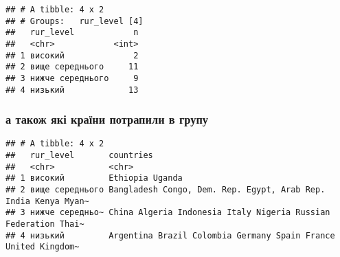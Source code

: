 \documentclass[
]{article}
\newenvironment{Shaded}{\begin{snugshade}}{\end{snugshade}}
\newcommand{\ControlFlowTok}[1]{\textcolor[rgb]{0.13,0.29,0.53}{\textbf{#1}}}
\newcommand{\DataTypeTok}[1]{\textcolor[rgb]{0.13,0.29,0.53}{#1}}
\newcommand{\DecValTok}[1]{\textcolor[rgb]{0.00,0.00,0.81}{#1}}
\newcommand{\KeywordTok}[1]{\textcolor[rgb]{0.13,0.29,0.53}{\textbf{#1}}}
\newcommand{\NormalTok}[1]{#1}
\newcommand{\OperatorTok}[1]{\textcolor[rgb]{0.81,0.36,0.00}{\textbf{#1}}}
\newcommand{\OtherTok}[1]{\textcolor[rgb]{0.56,0.35,0.01}{#1}}
\newcommand{\StringTok}[1]{\textcolor[rgb]{0.31,0.60,0.02}{#1}}
\begin{document}
\begin{verbatim}
## # A tibble: 4 x 2
## # Groups:   rur_level [4]
##   rur_level            n
##   <chr>            <int>
## 1 високий              2
## 2 вище середнього     11
## 3 нижче середнього     9
## 4 низький             13
\end{verbatim}

\hypertarget{ux430-ux442ux430ux43aux43eux436-ux44fux43aux456-ux43aux440ux430ux457ux43dux438-ux43fux43eux442ux440ux430ux43fux438ux43bux438-ux432-ux433ux440ux443ux43fux443}{%
\subsubsection{а також які країни потрапили в
групу}\label{ux430-ux442ux430ux43aux43eux436-ux44fux43aux456-ux43aux440ux430ux457ux43dux438-ux43fux43eux442ux440ux430ux43fux438ux43bux438-ux432-ux433ux440ux443ux43fux443}}

\begin{Shaded}
\end{Shaded}

\begin{verbatim}
## # A tibble: 4 x 2
##   rur_level       countries                                                     
##   <chr>           <chr>                                                         
## 1 високий         Ethiopia Uganda                                               
## 2 вище середнього Bangladesh Congo, Dem. Rep. Egypt, Arab Rep. India Kenya Myan~
## 3 нижче середньо~ China Algeria Indonesia Italy Nigeria Russian Federation Thai~
## 4 низький         Argentina Brazil Colombia Germany Spain France United Kingdom~
\end{verbatim}
\end{document}
